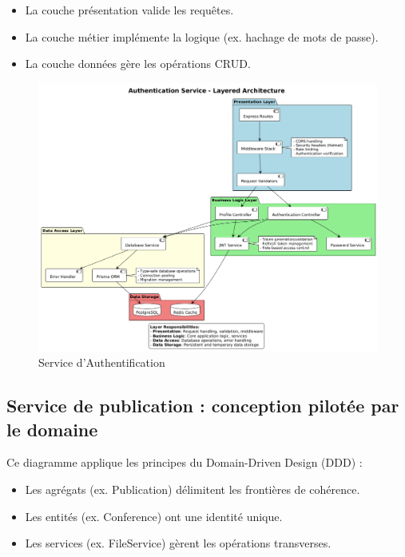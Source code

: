 \documentclass{rapportPfe}
\begin{document}
\begin{itemize}
    \item La couche présentation valide les requêtes.
    \item La couche métier implémente la logique (ex. hachage de mots de passe).
    \item La couche données gère les opérations CRUD.
\end{itemize}


\begin{figure}[htbp]
    \centering
    \includegraphics[width=1.1\textwidth]{diagrams/diagram2.png}
    \caption{Service d’Authentification}
    \label{fig:diagram2}
\end{figure}

\newpage
\FloatBarrier
\subsection{Service de publication : conception pilotée par le domaine}
Ce diagramme applique les principes du Domain-Driven Design (DDD) :

\begin{itemize}
    \item Les agrégats (ex. Publication) délimitent les frontières de cohérence.
    \item Les entités (ex. Conference) ont une identité unique.
    \item Les services (ex. FileService) gèrent les opérations transverses.
\end{itemize}
\end{document}
